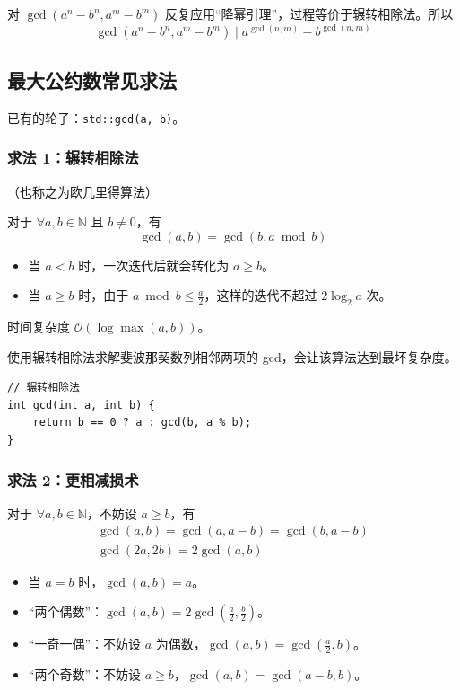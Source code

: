 对 $\gcd(a^n - b^n, a^m - b^m)$ 反复应用“降幂引理”，过程等价于辗转相除法。所以
\[
\gcd(a^n - b^n, a^m - b^m) \mid a^{\gcd(n, m)} - b^{\gcd(n, m)}
\]

\subsection{最大公约数常见求法}

已有的轮子：\texttt{std::gcd(a, b)}。

\subsubsection{求法 1：辗转相除法}

（也称之为欧几里得算法）

对于 $\forall a, b \in \mathbb{N}$ 且 $b \neq 0$，有
\[
\gcd(a, b) = \gcd(b, a \bmod b)
\]

\begin{itemize}
    \item 当 $a < b$ 时，一次迭代后就会转化为 $a \geq b$。
    \item 当 $a \geq b$ 时，由于 $a \bmod b \leq \frac{a}{2}$，这样的迭代不超过 $2\log_2 a$ 次。
\end{itemize}

时间复杂度 $\mathcal{O}(\log \max(a, b))$。

使用辗转相除法求解斐波那契数列相邻两项的 gcd，会让该算法达到最坏复杂度。

\begin{verbatim}
// 辗转相除法
int gcd(int a, int b) {
    return b == 0 ? a : gcd(b, a % b);
}
\end{verbatim}

\subsubsection{求法 2：更相减损术}

对于 $\forall a, b \in \mathbb{N}$，不妨设 $a\geq b$，有
\[
\begin{gathered}
\gcd(a, b) = \gcd(a, a - b) = \gcd(b, a - b) \\
\gcd(2a, 2b) = 2\gcd(a, b)
\end{gathered}
\]

\begin{itemize}
    \item 当 $a = b$ 时，$\gcd(a, b) = a$。
    \item“两个偶数”：$\gcd(a, b) = 2\gcd(\frac{a}{2}, \frac{b}{2})$。
    \item“一奇一偶”：不妨设 $a$ 为偶数，$\gcd(a, b) = \gcd(\frac{a}{2}, b)$。
    \item“两个奇数”：不妨设 $a \geq b$，$\gcd(a, b) = \gcd(a - b, b)$。
\end{itemize}

